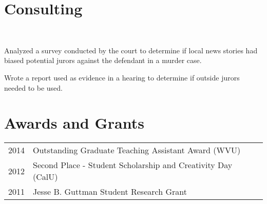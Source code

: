 \documentclass[letterpaper]{deedy-resume} %
\begin{document}
\begin{minipage}[t]{0.63\textwidth}
\section{Consulting}
\\
\begin{tightitemize}
\item Analyzed a survey conducted by the court to determine if
  local news stories had biased potential jurors against the defendant in a
  murder case.
\item Wrote a report used as evidence in a hearing to determine if
  outside jurors needed to be used.
\end{tightitemize}

\sectionspace %


\vspace{-7pt}
\section{Awards and Grants} 

\begin{tabular}{rl}
2014 & Outstanding Graduate Teaching Assistant Award (WVU)\\
2012 & Second Place - Student Scholarship and Creativity Day (CalU)\\
2011 & Jesse B. Guttman Student Research Grant\\
\end{tabular}

\sectionspace %




\end{minipage} %
\end{document}
